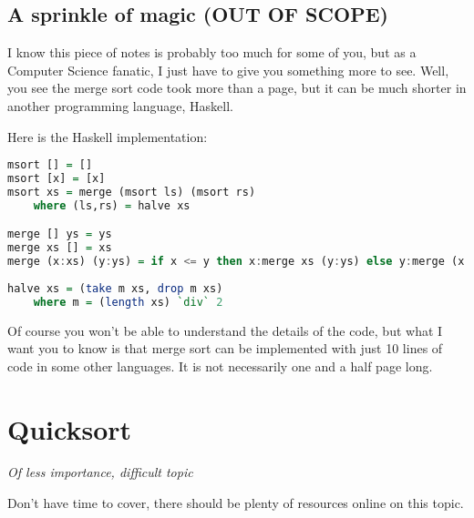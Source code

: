 \subsection*{A sprinkle of magic (OUT OF SCOPE)}

I know this piece of notes is probably too much for some of you, but as a Computer Science fanatic, I just have to give you something more to see. Well, you see the merge sort code took more than a page, but it can be much shorter in another programming language, Haskell. 

Here is the Haskell implementation:

\begin{lstlisting}[language=Haskell]
msort [] = []
msort [x] = [x]
msort xs = merge (msort ls) (msort rs)
    where (ls,rs) = halve xs

merge [] ys = ys
merge xs [] = xs
merge (x:xs) (y:ys) = if x <= y then x:merge xs (y:ys) else y:merge (x:xs) ys
    
halve xs = (take m xs, drop m xs)
    where m = (length xs) `div` 2

\end{lstlisting}

Of course you won't be able to understand the details of the code, but what I want you to know is that merge sort can be implemented with just 10 lines of code in some other languages. It is not necessarily one and a half page long.

\section{Quicksort}

\textit{Of less importance, difficult topic}


Don't have time to cover, there should be plenty of resources online on this topic.




    
    

